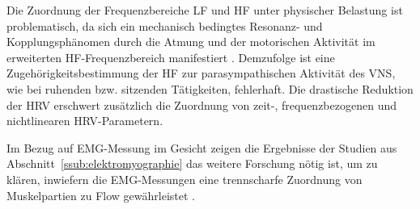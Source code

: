 Die Zuordnung der Frequenzbereiche \ac{LF} und \ac{HF} unter physischer Belastung ist problematisch, da sich ein mechanisch bedingtes Resonanz- und Kopplungsphänomen durch die Atmung und der motorischen Aktivität im erweiterten \ac{HF}-Frequenzbereich manifestiert \citep[][S.~62]{Hoos2010}. Demzufolge ist eine Zugehörigkeitsbestimmung der \ac{HF} zur parasympathischen Aktivität des \ac{VNS}, wie bei ruhenden bzw. sitzenden Tätigkeiten, fehlerhaft. Die drastische Reduktion der \ac{HRV} erschwert zusätzlich die Zuordnung von zeit-, frequenzbezogenen und nichtlinearen \ac{HRV}-Parametern.

Im Bezug auf EMG-Messung im Gesicht zeigen die Ergebnisse der Studien aus Abschnitt~\ref{ssub:elektromyographie} das weitere Forschung nötig ist, um zu klären, inwiefern die \ac{EMG}-Messungen eine trennscharfe Zuordnung von Muskelpartien zu Flow gewährleistet \citep[][]{Peifer2012}.


